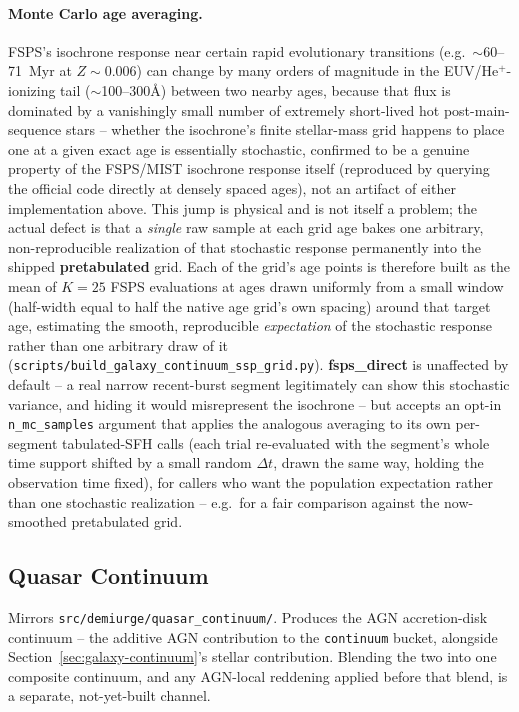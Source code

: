 \documentclass{aastex7}
\begin{document}
\paragraph{Monte Carlo age averaging.} FSPS's isochrone response near
certain rapid evolutionary transitions (e.g.\ $\sim$60--71~Myr at
$Z\!\sim\!0.006$) can change by many orders of magnitude in the EUV/He$^+$-
ionizing tail ($\sim$100--300\AA) between two nearby ages, because that
flux is dominated by a vanishingly small number of extremely short-lived
hot post-main-sequence stars -- whether the isochrone's finite stellar-mass
grid happens to place one at a given exact age is essentially stochastic,
confirmed to be a genuine property of the FSPS/MIST isochrone response
itself (reproduced by querying the official code directly at densely
spaced ages), not an artifact of either implementation above. This jump is
physical and is not itself a problem; the actual defect is that a
\emph{single} raw sample at each grid age bakes one arbitrary,
non-reproducible realization of that stochastic response permanently into
the shipped \textbf{pretabulated} grid. Each of the grid's age points is
therefore built as the mean of $K=25$ FSPS evaluations at ages drawn
uniformly from a small window (half-width equal to half the native age
grid's own spacing) around that target age, estimating the smooth,
reproducible \emph{expectation} of the stochastic response rather than one
arbitrary draw of it (\texttt{scripts/build\_galaxy\_continuum\_ssp\_grid.py}).
\textbf{fsps\_direct} is unaffected by default -- a real narrow recent-burst
segment legitimately can show this stochastic variance, and hiding it would
misrepresent the isochrone -- but accepts an opt-in \texttt{n\_mc\_samples}
argument that applies the analogous averaging to its own per-segment
tabulated-SFH calls (each trial re-evaluated with the segment's whole time
support shifted by a small random $\Delta t$, drawn the same way, holding
the observation time fixed), for callers who want the population
expectation rather than one stochastic realization -- e.g.\ for a fair
comparison against the now-smoothed pretabulated grid.

\subsection{Quasar Continuum} \label{sec:quasar-continuum}
Mirrors \texttt{src/demiurge/quasar\_continuum/}. Produces the AGN
accretion-disk continuum -- the additive AGN contribution to the
\texttt{continuum} bucket, alongside Section~\ref{sec:galaxy-continuum}'s
stellar contribution. Blending the two into one composite continuum, and
any AGN-local reddening applied before that blend, is a separate,
not-yet-built channel.
\end{document}
